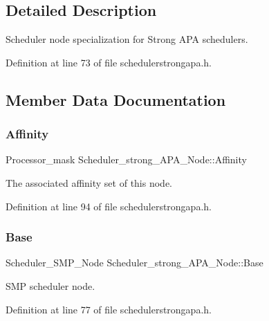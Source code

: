 \subsection{Detailed Description}
Scheduler node specialization for Strong A\+PA schedulers. 

Definition at line 73 of file schedulerstrongapa.\+h.



\subsection{Member Data Documentation}
\mbox{\label{structScheduler__strong__APA__Node_a7672e477658785808b0069f11bc4d24e}} 
\subsubsection{\texorpdfstring{Affinity}{Affinity}}
{\footnotesize\ttfamily Processor\+\_\+mask Scheduler\+\_\+strong\+\_\+\+A\+P\+A\+\_\+\+Node\+::\+Affinity}



The associated affinity set of this node. 



Definition at line 94 of file schedulerstrongapa.\+h.

\mbox{\label{structScheduler__strong__APA__Node_ae86cbf5fd8743267abe33bed6d8b0fe6}} 
\subsubsection{\texorpdfstring{Base}{Base}}
{\footnotesize\ttfamily Scheduler\+\_\+\+S\+M\+P\+\_\+\+Node Scheduler\+\_\+strong\+\_\+\+A\+P\+A\+\_\+\+Node\+::\+Base}



S\+MP scheduler node. 



Definition at line 77 of file schedulerstrongapa.\+h.


